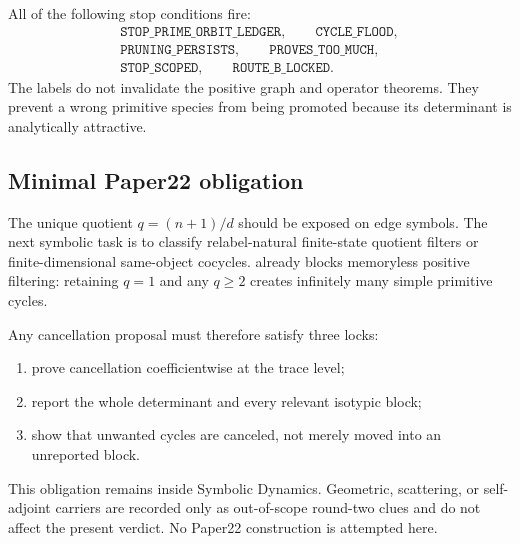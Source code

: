 All of the following stop conditions fire:
\[
\begin{gathered}
\texttt{STOP\_PRIME\_ORBIT\_LEDGER},\qquad
\texttt{CYCLE\_FLOOD},\\
\texttt{PRUNING\_PERSISTS},\qquad
\texttt{PROVES\_TOO\_MUCH},\\
\texttt{STOP\_SCOPED},\qquad
\texttt{ROUTE\_B\_LOCKED}.
\end{gathered}
\]
The labels do not invalidate the positive graph and operator theorems.  They
prevent a wrong primitive species from being promoted because its determinant
is analytically attractive.

\subsection{Minimal Paper22 obligation}

The unique quotient \(q=(n+1)/d\) should be exposed on edge symbols.  The next
symbolic task is to classify relabel-natural finite-state quotient filters or
finite-dimensional same-object cocycles.   already blocks
memoryless positive filtering: retaining \(q=1\) and any \(q\ge2\) creates
infinitely many simple primitive cycles.

Any cancellation proposal must therefore satisfy three locks:

\begin{enumerate}
  \item prove cancellation coefficientwise at the trace level;
  \item report the whole determinant and every relevant isotypic block;
  \item show that unwanted cycles are canceled, not merely moved into an
  unreported block.
\end{enumerate}

This obligation remains inside Symbolic Dynamics.  Geometric, scattering, or
self-adjoint carriers are recorded only as out-of-scope round-two clues and
do not affect the present verdict.  No Paper22 construction is attempted
here.
